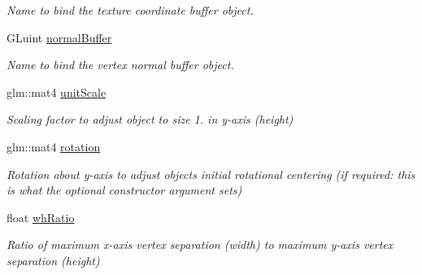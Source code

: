 \begin{DoxyCompactItemize}
\begin{DoxyCompactList}\small\item\em Name to bind the texture coordinate buffer object. \end{DoxyCompactList}\item 
G\+Luint \hyperlink{class_obj_g_p_u_data_a3d56bdaa9f44c1c780761b0cd10f7dc3}{normal\+Buffer}\hypertarget{class_obj_g_p_u_data_a3d56bdaa9f44c1c780761b0cd10f7dc3}{}\label{class_obj_g_p_u_data_a3d56bdaa9f44c1c780761b0cd10f7dc3}

\begin{DoxyCompactList}\small\item\em Name to bind the vertex normal buffer object. \end{DoxyCompactList}\item 
glm\+::mat4 \hyperlink{class_obj_g_p_u_data_ac28a5f3da3cea8eaf4b4cc52596297fd}{unit\+Scale}\hypertarget{class_obj_g_p_u_data_ac28a5f3da3cea8eaf4b4cc52596297fd}{}\label{class_obj_g_p_u_data_ac28a5f3da3cea8eaf4b4cc52596297fd}

\begin{DoxyCompactList}\small\item\em Scaling factor to adjust object to size 1. in y-\/axis (height) \end{DoxyCompactList}\item 
glm\+::mat4 \hyperlink{class_obj_g_p_u_data_a208435c6c7c618dcf608e165297de85a}{rotation}\hypertarget{class_obj_g_p_u_data_a208435c6c7c618dcf608e165297de85a}{}\label{class_obj_g_p_u_data_a208435c6c7c618dcf608e165297de85a}

\begin{DoxyCompactList}\small\item\em Rotation about y-\/axis to adjust objects initial rotational centering (if required\+: this is what the optional constructor argument sets) \end{DoxyCompactList}\item 
float \hyperlink{class_obj_g_p_u_data_aa95922f6ad01e53e638ae6dd1fa698a5}{wh\+Ratio}\hypertarget{class_obj_g_p_u_data_aa95922f6ad01e53e638ae6dd1fa698a5}{}\label{class_obj_g_p_u_data_aa95922f6ad01e53e638ae6dd1fa698a5}

\begin{DoxyCompactList}\small\item\em Ratio of maximum x-\/axis vertex separation (width) to maximum y-\/axis vertex separation (height) \end{DoxyCompactList}\end{DoxyCompactItemize}
